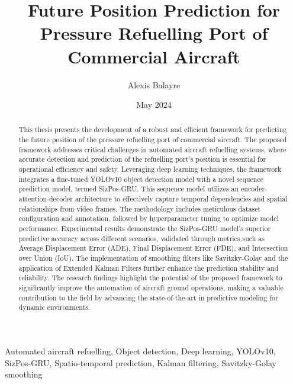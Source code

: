 \documentclass[12pt,oneside]{book} %
\title{Future Position Prediction for Pressure Refuelling Port
    of Commercial Aircraft}
\author{Alexis Balayre}
\date{May 2024}
\begin{document}
%
%

\frontmatter

\maketitle

\begin{abstract}
    This thesis presents the development of a robust and efficient framework for predicting the future position of the pressure refuelling port of commercial aircraft. The proposed framework addresses critical challenges in automated aircraft refuelling systems, where accurate detection and prediction of the refuelling port’s position is essential for operational efficiency and safety. Leveraging deep learning techniques, the framework integrates a fine-tuned YOLOv10 object detection model with a novel sequence prediction model, termed SizPos-GRU. This sequence model utilizes an encoder-attention-decoder architecture to effectively capture temporal dependencies and spatial relationships from video frames. The methodology includes meticulous dataset configuration and annotation, followed by hyperparameter tuning to optimize model performance. Experimental results demonstrate the SizPos-GRU model’s superior predictive accuracy across different scenarios, validated through metrics such as Average Displacement Error (ADE), Final Displacement Error (FDE), and Intersection over Union (IoU). The implementation of smoothing filters like Savitzky-Golay and the application of Extended Kalman Filters further enhance the prediction stability and reliability. The research findings highlight the potential of the proposed framework to significantly improve the automation of aircraft ground operations, making a valuable contribution to the field by advancing the state-of-the-art in predictive modeling for dynamic environments.
\end{abstract}

\begin{keywords}
    Automated aircraft refuelling, Object detection, Deep learning, YOLOv10, SizPos-GRU, Spatio-temporal prediction, Kalman filtering, Savitzky-Golay smoothing
\end{keywords}

\end{document}
